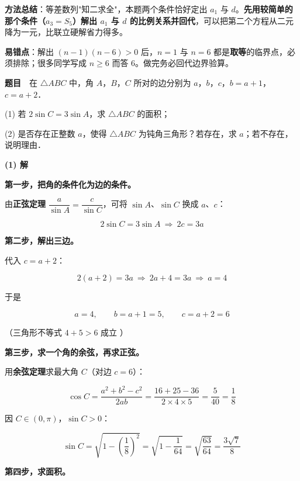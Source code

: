 
\begin{gktip}
\textbf{方法总结}：等差数列"知二求全"，本题两个条件恰好定出 $a_1$ 与 $d$。\textbf{先用较简单的那个条件（$a_3=S_5$）解出 $a_1$ 与 $d$ 的比例关系并回代}，可以把第二个方程从二元降为一元，比联立硬解省力得多。

\textbf{易错点}：解出 $(n-1)(n-6)>0$ 后，$n=1$ 与 $n=6$ 都是\textbf{取等}的临界点，必须排除；很多同学写成 $n\ge6$ 而答 $6$。做完务必回代边界验算。
\end{gktip}

\par\medskip


\textbf{题目}　在 $\triangle ABC$ 中，角 $A$，$B$，$C$ 所对的边分别为 $a$，$b$，$c$，$b=a+1$，$c=a+2$．

  (1) 若 $2\sin C=3\sin A$，求 $\triangle ABC$ 的面积；

  (2) 是否存在正整数 $a$，使得 $\triangle ABC$ 为钝角三角形？若存在，求 $a$；若不存在，说明理由．

\par\medskip

\textbf{(1) 解}

\textbf{第一步，把角的条件化为边的条件。}

由\textbf{正弦定理} $\dfrac a{\sin A}=\dfrac c{\sin C}$，可将 $\sin A$、$\sin C$ 换成 $a$、$c$：

\[2\sin C=3\sin A\ \Longrightarrow\ 2c=3a\]

\textbf{第二步，解出三边。}

代入 $c=a+2$：

\[2(a+2)=3a\ \Longrightarrow\ 2a+4=3a\ \Longrightarrow\ a=4\]

于是

\[a=4,\qquad b=a+1=5,\qquad c=a+2=6\]

（三角形不等式 $4+5>6$ 成立 ）

\textbf{第三步，求一个角的余弦，再求正弦。}

用\textbf{余弦定理}求最大角 $C$（对边 $c=6$）：

\[\cos C=\frac{a^{2}+b^{2}-c^{2}}{2ab}=\frac{16+25-36}{2\times4\times5}=\frac5{40}=\frac18\]

因 $C\in(0,\pi)$，$\sin C>0$：

\[\sin C=\sqrt{1-\left(\frac18\right)^{2}}=\sqrt{1-\frac1{64}}=\sqrt{\frac{63}{64}}=\frac{3\sqrt7}8\]

\textbf{第四步，求面积。}

